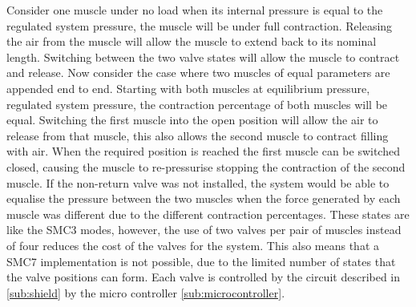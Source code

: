 \documentclass[11pt,a4paper]{article}
\begin{document}
\begin{figure}[hbt!]
{
    }
    \label{fig:pneumatic_valve}
\end{figure}

Consider one muscle under no load when its internal pressure is equal to the regulated system pressure, the muscle will be under full contraction. Releasing the air from the muscle will allow the muscle to extend back to its nominal length. Switching between the two valve states will allow the muscle to contract and release. Now consider the case where two muscles of equal parameters are appended end to end. Starting with both muscles at equilibrium pressure, regulated system pressure, the contraction percentage of both muscles will be equal. Switching the first muscle into the open position will allow the air to release from that muscle, this also allows the second muscle to contract filling with air. When the required position is reached the first muscle can be switched closed, causing the muscle to re-pressurise stopping the contraction of the second muscle. If the non-return valve was not installed, the system would be able to equalise the pressure between the two muscles when the force generated by each muscle was different due to the different contraction percentages. These states are like the SMC3 modes, however, the use of two valves per pair of muscles instead of four reduces the cost of the valves for the system. This also means that a SMC7 implementation is not possible, due to the limited number of states that the valve positions can form.
Each valve is controlled by the circuit described in \cref{sub:shield} by the micro controller \cref{sub:microcontroller}.
\end{document}

